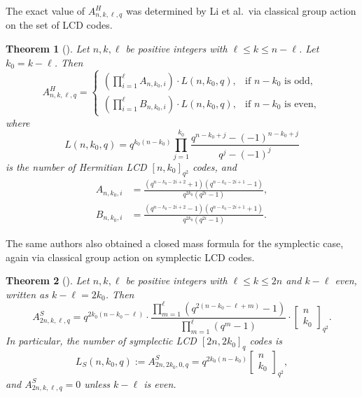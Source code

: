 \documentclass[11pt]{article}
\theoremstyle{plain}
\newtheorem{theorem}{Theorem}
\theoremstyle{remark}
\begin{document}
The exact value of $A^H_{n,k,\ell,q}$ was determined by Li et al.\
via classical group action on the set of LCD codes.

\begin{theorem}[{\cite[Theorem~3.11]{LSL2024}}]\label{thm:LSL}
Let $n,k,\ell$ be positive integers with $\ell \leq k \leq n - \ell$.
Let $k_0 = k - \ell$.
Then
\[
  A^H_{n,k,\ell,q} = \begin{cases}
    \displaystyle\left(\prod_{i=1}^{\ell} A_{n,k_0,i}\right) \cdot L(n,k_0,q), & \text{if } n - k_0 \text{ is odd}, \\[10pt]
    \displaystyle\left(\prod_{i=1}^{\ell} B_{n,k_0,i}\right) \cdot L(n,k_0,q), & \text{if } n - k_0 \text{ is even},
  \end{cases}
\]
where
\[
  L(n,k_0,q) = q^{k_0(n-k_0)} \prod_{j=1}^{k_0} \frac{q^{n-k_0+j} - (-1)^{n-k_0+j}}{q^j - (-1)^j}
\]
is the number of Hermitian LCD $[n,k_0]_{q^2}$ codes, and
\begin{align*}
  A_{n,k_0,i} &= \frac{(q^{n-k_0-2i+2}+1)(q^{n-k_0-2i+1}-1)}{q^{2k_0}(q^{2i}-1)}, \\
  B_{n,k_0,i} &= \frac{(q^{n-k_0-2i+2}-1)(q^{n-k_0-2i+1}+1)}{q^{2k_0}(q^{2i}-1)}.
\end{align*}
\end{theorem}

The same authors also obtained a closed mass formula for the symplectic case,
again via classical group action on symplectic LCD codes.

\begin{theorem}[{\cite[Theorem 4.9]{LSL2024}}]\label{thm:LSL-symp}
Let $n, k, \ell$ be positive integers with $\ell \leq k \leq 2n$ and
$k - \ell$ even, written as $k - \ell = 2k_0$. Then
\[
  A^S_{2n,k,\ell,q} = q^{2k_0(n-k_0-\ell)} \cdot
  \frac{\prod_{m=1}^{\ell}(q^{2(n-k_0-\ell+m)}-1)}{\prod_{m=1}^{\ell}(q^m-1)} \cdot
  \begin{bmatrix} n \\ k_0 \end{bmatrix}_{q^2}.
\]
In particular, the number of symplectic LCD $[2n, 2k_0]_q$ codes is
\[
  L_S(n, k_0, q) := A^S_{2n, 2k_0, 0, q} = q^{2k_0(n-k_0)} \begin{bmatrix} n \\ k_0 \end{bmatrix}_{q^2},
\]
and $A^S_{2n, k, \ell, q} = 0$ unless $k - \ell$ is even.
\end{theorem}
\end{document}
